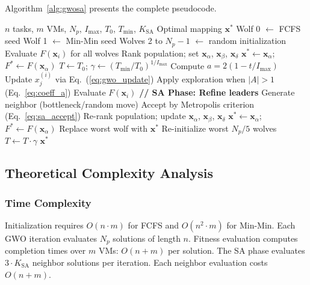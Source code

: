 \documentclass[conference]{IEEEtran}
\begin{document}
Algorithm~\ref{alg:gwosa} presents the complete pseudocode.

\begin{algorithm}[!t]
\caption{Hybrid GWO-SA for Cloud Task Scheduling}
\label{alg:gwosa}
\begin{algorithmic}[1]
\REQUIRE $n$ tasks, $m$ VMs, $N_p$, $I_{\max}$, $T_0$, $T_{\min}$, $K_{\text{SA}}$
\ENSURE Optimal mapping $\mathbf{x}^*$
\STATE Wolf 0 $\leftarrow$ FCFS seed
\STATE Wolf 1 $\leftarrow$ Min-Min seed
\STATE Wolves 2 to $N_p{-}1$ $\leftarrow$ random initialization
\STATE Evaluate $F(\mathbf{x}_i)$ for all wolves
\STATE Rank population; set $\mathbf{x}_\alpha$, $\mathbf{x}_\beta$, $\mathbf{x}_\delta$
\STATE $\mathbf{x}^* \leftarrow \mathbf{x}_\alpha$; $F^* \leftarrow F(\mathbf{x}_\alpha)$
\STATE $T \leftarrow T_0$; $\gamma \leftarrow (T_{\min}/T_0)^{1/I_{\max}}$
    \STATE Compute $a = 2(1 - t/I_{\max})$
            \STATE Update $x_j^{(i)}$ via Eq.~(\ref{eq:gwo_update})
            \STATE Apply exploration when $|A| > 1$ (Eq.~\ref{eq:coeff_a})
        \ENDFOR
        \STATE Evaluate $F(\mathbf{x}_i)$
    \ENDFOR
    \STATE \textbf{// SA Phase: Refine leaders}
            \STATE Generate neighbor (bottleneck/random move)
            \STATE Accept by Metropolis criterion (Eq.~\ref{eq:sa_accept})
        \ENDFOR
    \ENDFOR
    \STATE Re-rank population; update $\mathbf{x}_\alpha$, $\mathbf{x}_\beta$, $\mathbf{x}_\delta$
        \STATE $\mathbf{x}^* \leftarrow \mathbf{x}_\alpha$; $F^* \leftarrow F(\mathbf{x}_\alpha)$
    \ELSE
        \STATE Replace worst wolf with $\mathbf{x}^*$
    \ENDIF
        \STATE Re-initialize worst $N_p/5$ wolves
    \ENDIF
    \STATE $T \leftarrow T \cdot \gamma$
\ENDFOR
\RETURN $\mathbf{x}^*$
\end{algorithmic}
\end{algorithm}


\subsection{Theoretical Complexity Analysis}

\subsubsection{Time Complexity}
Initialization requires $O(n \cdot m)$ for FCFS and $O(n^2 \cdot m)$ for Min-Min.
Each GWO iteration evaluates $N_p$ solutions of length $n$.
Fitness evaluation computes completion times over $m$ VMs: $O(n + m)$ per solution.
The SA phase evaluates $3 \cdot K_{\text{SA}}$ neighbor solutions per iteration.
Each neighbor evaluation costs $O(n + m)$.
\end{document}
